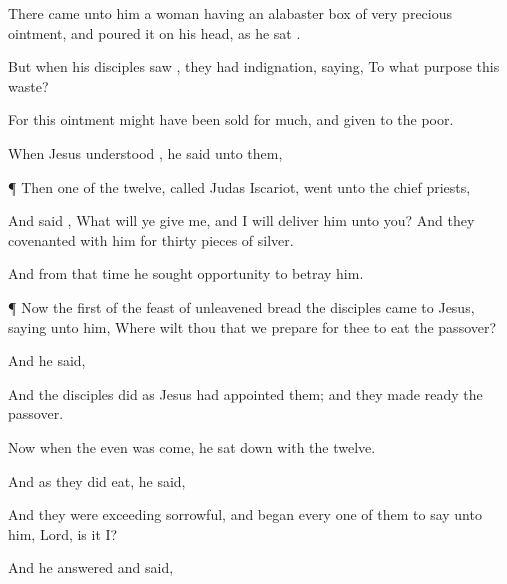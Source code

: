 {There came
unto
him a
woman
having an alabaster
box
of very
precious
ointment,
and poured
it
on
his
head, as he
sat
{}.

But
when
his
disciples
saw
{}, they had
indignation,
saying,
To what
purpose
{}
this
waste?

For
this
ointment
might have been
sold for
much,
and
given to the
poor.

When
Jesus
understood
{}, he
said unto
them,
{}





\par }{\PP {}¶
Then
one of the
twelve,
called
Judas
Iscariot,
went
unto the chief
priests,

And
said
{},
What will
ye
give
me, and
I will
deliver
him unto
you?
And they
covenanted with
him
for
thirty pieces of
silver.

And
from that
time he
sought
opportunity
to
betray
him.


\par }{\PP {}¶
Now the
first
{} of the feast of unleavened
bread the
disciples
came to
Jesus,
saying unto
him,
Where wilt thou
that we
prepare for
thee to
eat the
passover?

And he
said,
{}

And the
disciples
did
as
Jesus had
appointed
them;
and they made
ready the
passover.

Now
when the
even was
come, he sat
down
with the
twelve.

And
as
they did
eat, he
said,
{}

And they
were
exceeding
sorrowful, and
began every
one of
them to
say unto
him,
Lord, is
it
I?

And he
answered and
said,
{}

}
